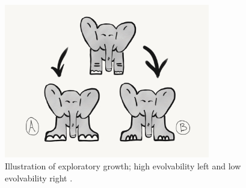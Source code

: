 \begin{figure}
    \centering
    \includegraphics[width=0.8\textwidth]{img/exploratory_growth}
 	\captionsetup{singlelinecheck=off,justification=raggedright}
  	\caption{Illustration of exploratory growth; high evolvability left and low evolvability right \cite{Downing2015IntelligenceSystems}.}
    \label{fig:exploratory_growth}
\end{figure}